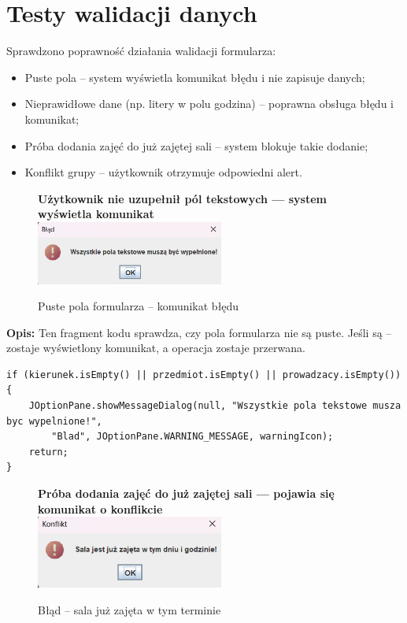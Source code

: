 \section{Testy walidacji danych}

Sprawdzono poprawność działania walidacji formularza:

\begin{itemize}
    \item Puste pola – system wyświetla komunikat błędu i nie zapisuje danych;
    \item Nieprawidłowe dane (np. litery w polu godzina) – poprawna obsługa błędu i komunikat;
    \item Próba dodania zajęć do już zajętej sali – system blokuje takie dodanie;
    \item Konflikt grupy – użytkownik otrzymuje odpowiedni alert.
\end{itemize}

\begin{figure}[H]
\centering
\textbf{Użytkownik nie uzupełnił pól tekstowych — system wyświetla komunikat}\\[0.5em]
\includegraphics[width=0.55\textwidth]{figures/Errors/add_panel_error.png}
\caption{Puste pola formularza – komunikat błędu}
\label{fig:empty-fields}
\end{figure}

\textbf{Opis:} Ten fragment kodu sprawdza, czy pola formularza nie są puste. Jeśli są – zostaje wyświetlony komunikat, a operacja zostaje przerwana.

\begin{lstlisting}[caption={Walidacja pustych pól}, label={lst:puste}]
if (kierunek.isEmpty() || przedmiot.isEmpty() || prowadzacy.isEmpty()) {
    JOptionPane.showMessageDialog(null, "Wszystkie pola tekstowe musza byc wypelnione!",
        "Blad", JOptionPane.WARNING_MESSAGE, warningIcon);
    return;
}
\end{lstlisting}

\begin{figure}[H]
\centering
\textbf{Próba dodania zajęć do już zajętej sali — pojawia się komunikat o konflikcie}\\[0.5em]
\includegraphics[width=0.55\textwidth]{figures/Errors/sala_zajeta_error.png}
\caption{Błąd – sala już zajęta w tym terminie}
\label{fig:room-taken}
\end{figure}

